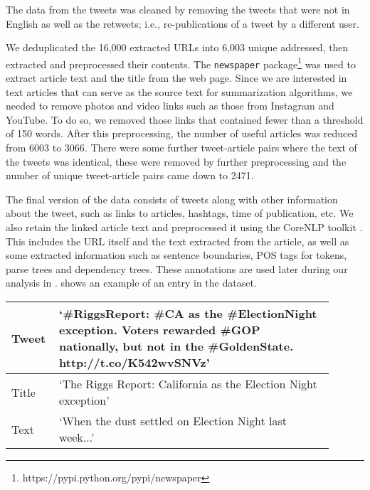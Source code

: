 The data from the tweets was cleaned by removing the tweets that were not in English as well as the retweets; i.e., re-publications of a tweet by a different user.

We deduplicated the 16,000 extracted URLs into 6,003 unique addressed, then extracted and preprocessed their contents. The \texttt{newspaper} package\footnote{https://pypi.python.org/pypi/newspaper} was used to extract article text and the title from the web page. Since we are interested in text articles that can serve as the source text for summarization algorithms, we needed to remove photos and video links such as those from Instagram and YouTube. To do so, we removed those links that contained fewer than a threshold of 150 words. After this preprocessing, the number of useful articles was reduced from 6003 to 3066. There were some further tweet-article pairs where the text of the tweets was identical, these were removed by further preprocessing and the number of unique tweet-article pairs came down to 2471. 

The final version of the data consists of tweets along with other information about the tweet, such as links to articles, hashtags, time of publication, etc. We also retain the linked article text and preprocessed it using the CoreNLP toolkit \cite{manning2014stanford}. This includes the URL itself and the text extracted from the article, as well as some extracted information such as sentence boundaries, POS tags for tokens, parse trees and dependency trees. These annotations are used later during our analysis in .  shows an example of an entry in the dataset.



\begin{table}[htbp]
\centering
\begin{tabular}{|p{0.1\linewidth}|p{0.8\linewidth}|}
\hline
Tweet & `\#RiggsReport: \#CA as the \#ElectionNight exception. Voters rewarded \#GOP nationally, but not in the \#GoldenState. http://t.co/K542wvSNVz' \\ \hline
Title & `The Riggs Report: California as the Election Night exception'                                                                                 \\ \hline
Text  & `When the dust settled on Election Night last week...'                                                                                         \\ \hline
\end{tabular}
\label{tab:ex1}
\end{table}